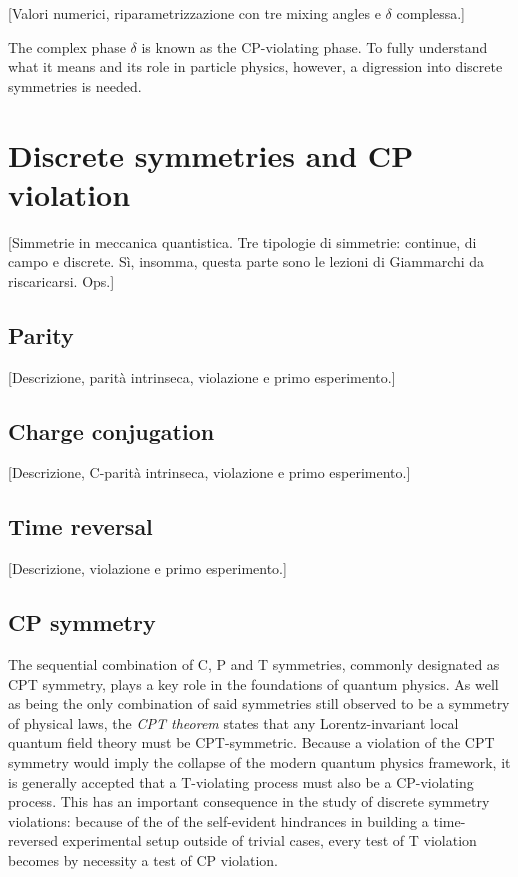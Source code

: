 [Valori numerici, riparametrizzazione con tre mixing angles e $\delta$ complessa.]

The complex phase $\delta$ is known as the CP-violating phase. To fully understand what it means and its role in particle physics, however, a digression into discrete symmetries is needed.

\section{Discrete symmetries and CP violation}
[Simmetrie in meccanica quantistica. Tre tipologie di simmetrie: continue, di campo e discrete. Sì, insomma, questa parte sono le lezioni di Giammarchi da riscaricarsi. Ops.]

\subsection{Parity}
[Descrizione, parità intrinseca, violazione e primo esperimento.]

\subsection{Charge conjugation}
[Descrizione, C-parità intrinseca, violazione e primo esperimento.]

\subsection{Time reversal}
[Descrizione, violazione e primo esperimento.]

\subsection{CP symmetry}
The sequential combination of C, P and T symmetries, commonly designated as CPT symmetry, plays a key role in the foundations of quantum physics.
As well as being the only combination of said symmetries still observed to be a symmetry of physical laws, the \textit{CPT theorem} states that any Lorentz-invariant local quantum field theory must be CPT-symmetric.
Because a violation of the CPT symmetry would imply the collapse of the modern quantum physics framework, it is generally accepted that a T-violating process must also be a CP-violating process.
This has an important consequence in the study of discrete symmetry violations: because of the of the self-evident hindrances in building a time-reversed experimental setup outside of trivial cases, every test of T violation becomes by necessity a test of CP violation.

